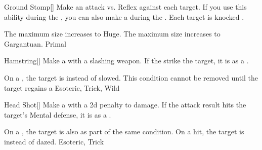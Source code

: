 \lowercase{\hypertarget{maneuver:Ground Stomp}{}}\label{maneuver:Ground Stomp}
\hypertarget{maneuver:Ground Stomp}{}
\begin{freeability}[Rank 3]{Ground Stomp}[]
Make an attack vs. Reflex against each target.
If you use this ability during the , you can also make a  during the .
\hit Each target is knocked \prone.

\rankline
{} The maximum size increases to Huge.
 The maximum size increases to Gargantuan.
 Primal
\end{freeability}
\vspace{0.25em}



\lowercase{\hypertarget{maneuver:Hamstring}{}}\label{maneuver:Hamstring}
\hypertarget{maneuver:Hamstring}{}
\begin{freeability}[Rank 3]{Hamstring}[]
Make a  with a slashing weapon.
If the strike  the target, it is  as a .

\rankline
{} On a , the target is  instead of slowed.
 This condition cannot be removed until the target regains a 
 Esoteric, Trick, Wild
\end{freeability}
\vspace{0.25em}



\lowercase{\hypertarget{maneuver:Head Shot}{}}\label{maneuver:Head Shot}
\hypertarget{maneuver:Head Shot}{}
\begin{freeability}[Rank 3]{Head Shot}[]
Make a  with a \minus2d penalty to damage.
If the attack result hits the target's Mental defense,
it is  as a .

\rankline
{} On a , the target is also  as part of the same condition.
 On a hit, the target is  instead of dazed.
 Esoteric, Trick
\end{freeability}
\vspace{0.25em}



